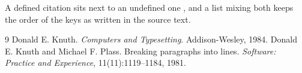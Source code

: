 \documentclass{article}
\begin{document}
A defined citation \cite{knuth84} sits next to an undefined one
\cite{missing}, and a list mixing both \cite{knuth84,nowhere,plass81}
keeps the order of the keys as written in the source text.

\begin{thebibliography}{9}
 Donald E. Knuth. \emph{Computers and Typesetting}. Addison-Wesley, 1984.
 Donald E. Knuth and Michael F. Plass. Breaking paragraphs
  into lines. \emph{Software: Practice and Experience}, 11(11):1119--1184, 1981.
\end{thebibliography}
\end{document}
